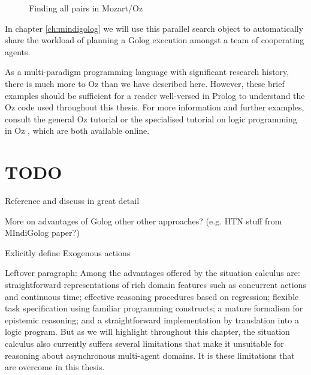 %
\begin{figure}[t]

\caption{Finding all pairs in Mozart/Oz\label{fig:Background:Parallel-All-Pairs}}

\end{figure}


In chapter \ref{ch:mindigolog} we will use this parallel search object
to automatically share the workload of planning a Golog execution
amongst a team of cooperating agents.

As a multi-paradigm programming language with significant research
history, there is much more to Oz than we have described here. However,
these brief examples should be sufficient for a reader well-versed
in Prolog to understand the Oz code used throughout this thesis. For
more information and further examples, consult the general Oz tutorial
\citep{haridi99oz_tutorial} or the specialised tutorial on logic
programming in Oz \citep{lpinoz99}, which are both available online.

\newpage{}


\section{TODO}

Reference and discuss \citep{pinto98sc_observations} in great detail

More on advantages of Golog other other approaches? (e.g. HTN stuff
from MIndiGolog paper?)

Exlicitly define Exogenous actions

Leftover paragraph: Among the advantages offered by the situation
calculus are: straightforward representations of rich domain features
such as concurrent actions and continuous time; effective reasoning
procedures based on regression; flexible task specification using
familiar programming constructs; a mature formalism for epistemic
reasoning; and a straightforward implementation by translation into
a logic program. But as we will highlight throughout this chapter,
the situation calculus also currently suffers several limitations
that make it unsuitable for reasoning about asynchronous multi-agent
domains. It is these limitations that are overcome in this thesis.

